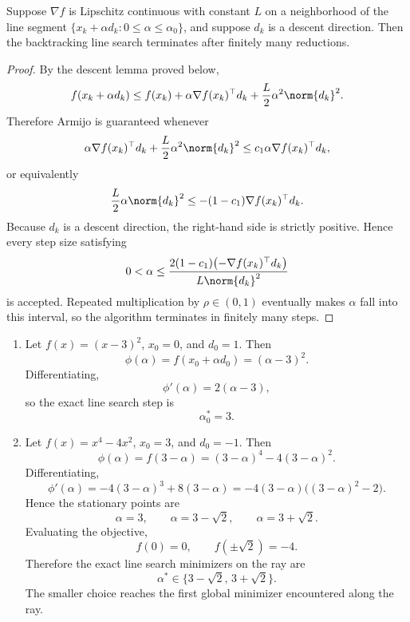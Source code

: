 \begin{proposition}\label{prop:l2-finite-termination-of-backtracking}
	Suppose $\nabla f$ is Lipschitz continuous with constant $L$ on a neighborhood of the line segment $\{x_k+\alpha d_k : 0 \le \alpha \le \alpha_0\}$, and suppose $d_k$ is a descent direction. Then the backtracking line search terminates after finitely many reductions.
\end{proposition}
\begin{proof}
	By the descent lemma proved below,
	\[
		f(x_k+\alpha d_k)
		\le f(x_k)+\alpha \nabla f(x_k)^\top d_k + \frac{L}{2}\alpha^2 \norm{d_k}^2.
	\]
	Therefore Armijo is guaranteed whenever
	\[
		\alpha \nabla f(x_k)^\top d_k + \frac{L}{2}\alpha^2 \norm{d_k}^2
		\le c_1 \alpha \nabla f(x_k)^\top d_k,
	\]
	or equivalently
	\[
		\frac{L}{2}\alpha \norm{d_k}^2
		\le
		-(1-c_1)\nabla f(x_k)^\top d_k.
	\]
	Because $d_k$ is a descent direction, the right-hand side is strictly positive. Hence every step size satisfying
	\[
		0<\alpha
		\le
		\frac{2(1-c_1)\bigl(-\nabla f(x_k)^\top d_k\bigr)}{L\norm{d_k}^2}
	\]
	is accepted. Repeated multiplication by $\rho \in (0,1)$ eventually makes $\alpha$ fall into this interval, so the algorithm terminates in finitely many steps.
\end{proof}

\begin{eg}
	\begin{enumerate}[label=(\alph*)]
		\item Let $f(x)=(x-3)^2$, $x_0=0$, and $d_0=1$. Then
		      \[
			      \phi(\alpha)=f(x_0+\alpha d_0)=(\alpha-3)^2.
		      \]
		      Differentiating,
		      \[
			      \phi'(\alpha)=2(\alpha-3),
		      \]
		      so the exact line search step is
		      \[
			      \alpha_0^\ast=3.
		      \]

		\item Let $f(x)=x^4-4x^2$, $x_0=3$, and $d_0=-1$. Then
		      \[
			      \phi(\alpha)=f(3-\alpha)=(3-\alpha)^4-4(3-\alpha)^2.
		      \]
		      Differentiating,
		      \[
			      \phi'(\alpha)
			      = -4(3-\alpha)^3 + 8(3-\alpha)
			      = -4(3-\alpha)\bigl((3-\alpha)^2-2\bigr).
		      \]
		      Hence the stationary points are
		      \[
			      \alpha = 3, \qquad \alpha = 3-\sqrt{2}, \qquad \alpha = 3+\sqrt{2}.
		      \]
		      Evaluating the objective,
		      \[
			      f(0)=0, \qquad f(\pm \sqrt{2})=-4.
		      \]
		      Therefore the exact line search minimizers on the ray are
		      \[
			      \alpha^\ast \in \{3-\sqrt{2},\,3+\sqrt{2}\}.
		      \]
		      The smaller choice reaches the first global minimizer encountered along the ray.
	\end{enumerate}
\end{eg}

